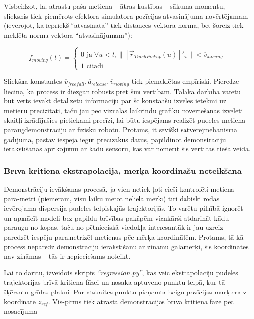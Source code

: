 \documentclass[12pt, a4paper]{article}
\numberwithin{equation}{section} %
\begin{document}
Visbeidzot, lai atrastu paša metiena -- ātras kustības -- sākuma momentu, slieksnis tiek piemērots efektora simulatora pozīcijas atvasinājuma novērtējumam (ievērojot, ka iepriekš ``atvasināta'' tiek distances vektora norma, bet šoreiz tiek meklēta norma vektora ``atvasinājumam''):

\begin{equation}
    f_{moving} (t) = \begin{cases}
        0 \text{ ja } \forall u < t,  \lVert \overline{\left [ \vec{r}_{TrashPickup}(u) \right ]'_u} \rVert  < \overline{v}_{moving} \\
        1 \text{ citādi }
    \end{cases}
\end{equation}

Sliekšņa konstantes $\overline{v}_{freefall}, \overline{a}_{release}, \overline{v}_{moving}$ tiek piemeklētas empīriski. Pieredze liecina, ka process ir diezgan robusts pret šīm vērtībām. Tālākā darbībā varētu būt vērts ievākt detalizētu informāciju par šo konstanšu izvēles ietekmi uz metienu precizitāti, taču jau pēc vizuālas laikrindu grafiku novērtēšanas izvēlēti skaitļi izrādījušies pietiekami precīzi, lai būtu iespējams realizēt pudeles metiena paraugdemonstrāciju ar fizisku robotu. Protams, it sevišķi satvērējmehānisma gadījumā, pastāv iespēja iegūt precīzākus datus, papildinot demonstrāciju ierakstīšanas aprīkojumu ar kādu sensoru, kas var nomērīt šīs vērtības tiešā veidā.

\subsubsection{Brīvā kritiena ekstrapolācija, mērķa koordināšu noteikšana}

Demonstrāciju ievākšanas procesā, ja vien netiek ļoti cieši kontrolēti metiena para-metri (piemēram, visu laiku metot nelielā mērķī) tīri dabiski rodas ievērojama dispersija pudeles telpiskajās trajektorijās. To varētu pilnībā ignorēt un apmācīt modeli bez papildu brīvības pakāpēm vienkārši atdarināt kādu paraugu no kopas, taču no pētnieciskā viedokļa interesantāk ir jau uzreiz paredzēt iespēju parametrizēt metienus pēc mērķa koordinātēm. Protams, tā kā process neparedz demonstrāciju ierakstīšanu ar zināmu galamērķi, šīs koordinātes nav zināmas -- tās ir nepieciešams noteikt.

Lai to darītu, izveidots skripts \textit{``regression.py''}, kas veic ekstrapolāciju pudeles trajektorijas brīvā kritiena fāzei un nosaka aptuveno punktu telpā, kur tā šķērsotu grīdas plakni. Par atskaites punktu pieņemta beigu pozīcijas marķiera z-koordināte $z_{ref}$. Vis-pirms tiek atrasta demonstrācijas brīvā kritiena fāze pēc nosacījuma
\end{document}
